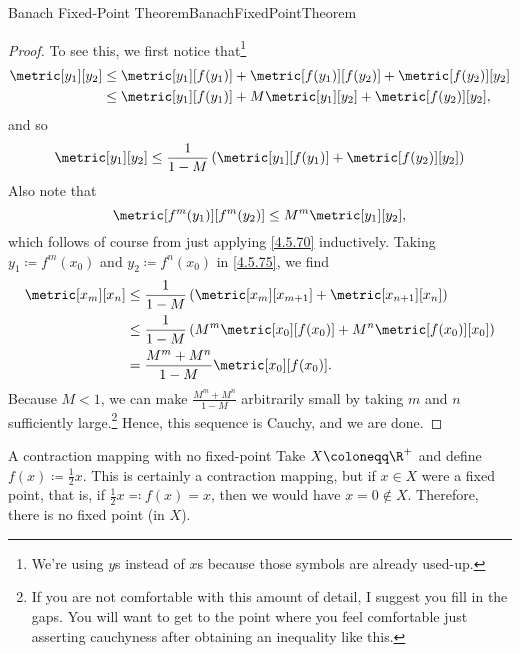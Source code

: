 \begin{thm}{Banach Fixed-Point Theorem}{BanachFixedPointTheorem}
\begin{proof}
To see this, we first notice that\footnote{We're using $y$s instead of $x$s because those symbols are already used-up.}
\begin{equation}
\begin{split}
\metric[y_1][y_2] & \leq \metric[y_1][f(y_1)]+\metric[f(y_1)][f(y_2)]+\metric[f(y_2)][y_2] \\
& \leq \metric[y_1][f(y_1)]+M\metric[y_1][y_2]+\metric[f(y_2)][y_2],
\end{split}
\end{equation}
and so
\begin{equation}\label{4.5.75}
\metric[y_1][y_2]\leq \frac{1}{1-M}\left( \metric[y_1][f(y_1)]+\metric[f(y_2)][y_2]\right) 
\end{equation}
Also note that
\begin{equation}
\metric[f^m(y_1)][f^m(y_2)]\leq M^m\metric[y_1][y_2],
\end{equation}
which follows of course from just applying \eqref{4.5.70} inductively.  Taking $y_1\coloneqq f^m(x_0)$ and $y_2\coloneqq f^n(x_0)$ in \eqref{4.5.75}, we find
\begin{equation}
\begin{split}
\metric[x_m][x_n] & \leq \frac{1}{1-M}\left( \metric[x_m][x_{m+1}]+\metric[x_{n+1}][x_n]\right) \\
& \leq \frac{1}{1-M}\left( M^m\metric[x_0][f(x_0)]+M^n\metric[f(x_0)][x_0]\right) \\
& =\frac{M^m+M^n}{1-M}\metric[x_0][f(x_0)].
\end{split}
\end{equation}
Because $M<1$, we can make $\frac{M^m+M^n}{1-M}$ arbitrarily small by taking $m$ and $n$ sufficiently large.\footnote{If you are not comfortable with this amount of detail, I suggest you fill in the gaps.  You will want to get to the point where you feel comfortable just asserting cauchyness after obtaining an inequality like this.}  Hence, this sequence is Cauchy, and we are done.
\end{proof}
\end{thm}
\begin{exm}{A contraction mapping with no fixed-point}{}
Take $X\coloneqq \R ^+$ and define $f(x)\coloneqq \frac{1}{2}x$.  This is certainly a contraction mapping, but if $x\in X$ were a fixed point, that is, if $\frac{1}{2}x\eqqcolon f(x)=x$, then we would have $x=0\notin X$.  Therefore, there is no fixed point (in $X$).
\end{exm}